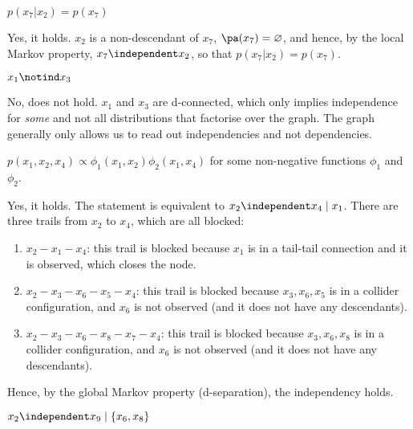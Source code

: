    \begin{exenumerate}
   \item  $p(x_7 | x_2) = p(x_7)$

     \begin{solution}
 Yes, it holds. $x_2$ is a non-descendant of $x_7$,
 $\pa(x_7)=\varnothing$, and hence, by the local Markov property, $x_7
 \independent x_2$, so that $p(x_7 | x_2) = p(x_7)$.
     \end{solution}
     
   \item  $x_1 \notind x_3$  

     \begin{solution}
 No, does not hold. $x_1$ and $x_3$ are d-connected, which only implies independence for \emph{some} and not all distributions that factorise over the graph. The graph generally only allows us to read out independencies and not dependencies.

     \end{solution}


   \item  $p(x_1,x_2,x_4) \propto \phi_1(x_1,x_2) \phi_2(x_1,x_4)$ for some non-negative functions $\phi_1$ and $\phi_2$. 

     \begin{solution}
       Yes, it holds. The statement is equivalent to $x_2 \independent x_4 \mid  x_1$. There are three trails from $x_2$ to $x_4$, which are all blocked:
       \begin{enumerate}
       \item $x_2-x_1-x_4$: this trail is blocked because $x_1$ is in a tail-tail connection and it is observed, which closes the node.
       \item $x_2-x_3-x_6-x_5-x_4$: this trail is blocked because
         $x_3, x_6, x_5$ is in a collider configuration, and $x_6$ is
         not observed (and it does not have any descendants).
       \item $x_2-x_3-x_6- x_8- x_7- x_4$: this trail is blocked because
         $x_3, x_6, x_8$ is in a collider configuration, and $x_6$ is
         not observed (and it does not have any descendants).
       \end{enumerate}
       Hence, by the global Markov property (d-separation), the independency holds.
     \end{solution}


   \item  $x_2 \independent x_9 \mid \{x_6, x_8\}$ 


\end{exenumerate}
